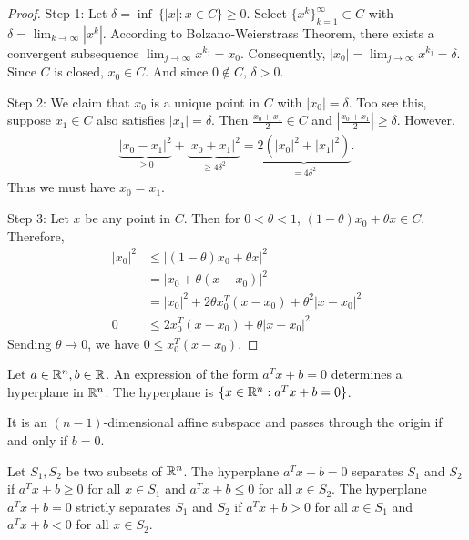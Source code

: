 \begin{proof}
Step 1:
Let $\delta = \inf \ \{ |x| : x \in C \} \ge 0$.
Select $\{ x^k \}_{k=1}^{\infty} \subset C$ with $\delta = \lim _{k \to \infty} |x^k|$.
According to Bolzano-Weierstrass Theorem, there exists a convergent subsequence $\lim _{j \to \infty} x^{k_j} = x_0$.
Consequently, $|x_0| = \lim _{j \to \infty} x^{k_j} = \delta$.
Since $C$ is closed, $x_0 \in C$.
And since $0 \notin C$, $\delta > 0$.

Step 2:
We claim that $x_0$ is a unique point in $C$ with $|x_0| = \delta$.
Too see this, suppose $x_1 \in C$  also satisfies $|x_1| = \delta$. Then $\frac{x_0 + x_1}{2} \in C$ and $\left|\frac{x_0 + x_1}{2}\right| \ge \delta$.
However,
\begin{align}
\underbrace{|x_0 - x_1|^2}_{\ge 0} + \underbrace{|x_0 + x_1|^2}_{\ge 4 \delta^2} = \underbrace{2 (|x_0|^2 + |x_1|^2)}_{=4 \delta^2}.
\end{align}
Thus we must have $x_0 = x_1$.

Step 3:
Let $x$ be any point in $C$.
Then for $0 < \theta < 1$, $(1-\theta) x_0 + \theta x \in C$.
Therefore,
\begin{align}
|x_0|^2 & \le |(1-\theta) x_0 + \theta x|^2 \\
        & = |x_0 + \theta (x-x_0)|^2 \\
        & = |x_0|^2 + 2 \theta x_0^T (x-x_0) + \theta ^2 |x-x_0|^2 \\
0       & \le 2 x_0^T (x-x_0) + \theta |x-x_0|^2
\end{align}
Sending $\theta \to 0$, we have $0 \le x_0 ^T (x-x_0)$.
\end{proof}

\begin{definition}[Hyperplane]
Let $a \in \mathbb{R}^n, b \in \mathbb{R}$.
An expression of the form $a^T x + b = 0$ determines a hyperplane in $\mathbb{R}^n$.
The hyperplane is $\{ x \in \mathbb{R}^n : a^T x + b = 0 \}$.
\end{definition}

It is an $(n-1)$-dimensional affine subspace and passes through the origin if and only if $b = 0$.

\begin{definition}
Let $S_1, S_2$ be two subsets of $\mathbb{R}^n$.
The hyperplane $a^T x + b = 0$ separates $S_1$ and $S_2$ if $a^T x + b \ge 0$ for all $x \in S_1$ and $a^T x + b \le 0$ for all $x \in S_2$.
The hyperplane $a^T x + b = 0$ strictly separates $S_1$ and $S_2$ if $a^T x + b > 0$ for all $x \in S_1$ and $a^T x + b < 0$ for all $x \in S_2$.
\end{definition}


